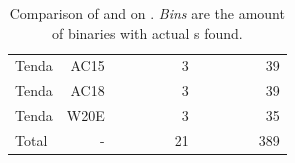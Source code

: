 \begin{table}[tb]
\begin{tabular}{lr:rrrrr:rrrrr}
		Tenda                  & AC15               &
		\satcManFifthAlerts    & \satcManFifthTP    & \satcManFifthTime                   & \satcManFifthBins                       & 3             &
		\mangoManFifthAlerts   & \mangoManFifthTP   & \mangoManFifthTime                  & \mangoManFifthBins                      & 39                                                                                                                                                         \\

		Tenda                  & AC18               &
		\satcManSixthAlerts    & \satcManSixthTP    & \satcManSixthTime                   & \satcManSixthBins                       & 3             &
		\mangoManSixthAlerts   & \mangoManSixthTP   & \mangoManSixthTime                  & \mangoManSixthBins                      & 39                                                                                                                                                         \\

		Tenda                  & W20E               &
		\satcManSeventhAlerts  & \satcManSeventhTP  & \satcManSeventhTime                 & \satcManSeventhBins                     & 3             &
		\mangoManSeventhAlerts & \mangoManSeventhTP & \mangoManSeventhTime                & \mangoManSeventhBins                    & 35                                                                                                                                                         \\
		\hline
		Total                  & -                  &
		\satcManTotalAlerts    & \satcManTotalTP    & \satcManTotalTime                   & \satcManTotalBins                       & 21            &
		\mangoManTotalAlerts   & \mangoManTotalTP   & \mangoManTotalTime                  & \mangoManTotalBins                      & 389                                                                                                                                                        \\
		\hline
	\end{tabular}
	\caption{Comparison of \satc and \toolname on \satcHandPickDataset. \textit{\trupoc Bins} are the amount of binaries with actual \trupoc{}s found.\\
	}
	\label{tab:mango_satc_manual}
\end{table}
